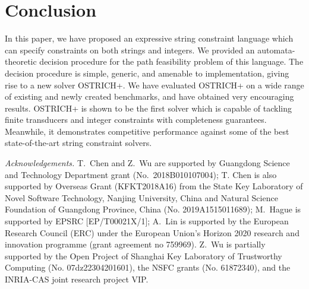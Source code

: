 \documentclass{llncs}
\begin{document}


\vspace{-3mm}
\section{Conclusion} \label{sec:conc}

In this paper, we have proposed  an expressive string constraint language which can specify constraints on both strings and integers.  We provided an automata-theoretic decision procedure for the path feasibility problem of this language. The decision procedure is simple, generic, and amenable to implementation, giving rise to a new solver OSTRICH+.  We have evaluated OSTRICH+ on  a wide range of existing and newly created benchmarks, and have obtained very encouraging results.  OSTRICH+ is shown to be the first solver  which is capable of tackling finite transducers and integer constraints with completeness guarantees. Meanwhile, it demonstrates competitive performance against some of the best state-of-the-art string constraint solvers.


\medskip
\small{
\noindent \emph{Acknowledgements.}  
T.~Chen and Z.~Wu are supported by Guangdong Science and Technology Department grant (No.\ 2018B010107004); T. Chen is also supported by Overseas Grant (KFKT2018A16) from the State Key Laboratory of
Novel Software Technology, Nanjing University, China and Natural Science Foundation of Guangdong Province, China (No. 2019A1515011689); M.~Hague is supported by EPSRC [EP/T00021X/1]; 
A.~Lin is supported by the European Research Council (ERC) under the European
Union's Horizon 2020 research and innovation programme (grant agreement no
759969). Z.~Wu is partially supported by  the Open Project of Shanghai Key Laboratory of Trustworthy Computing (No. 07dz22304201601), the NSFC grants (No. 61872340), and the INRIA-CAS joint research project VIP.   
}

\vspace{-3mm}




\iftoggle{full}
{
\newpage
\begin{appendix}

\end{appendix}
}
{}%
\end{document}

